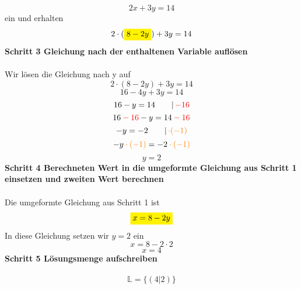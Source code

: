 \documentclass[10pt,landscape]{article}
\begin{document}
\begin{multicols}{3}
    \[2x + 3y = 14\]
    ein und erhalten
    \[2 \cdot ({\colorbox{yellow}{$8 - 2y$}}) + 3y = 14\]
    \textbf{Schritt 3 Gleichung nach der enthaltenen Variable auflösen}\\~\\
    Wir lösen die Gleichung nach y auf
    \[2 \cdot (8 - 2y) + 3y = 14\]
    \[16 - 4y + 3y = 14\]
    \[16 - y = 14 \qquad |\, {\color{red}-16}\]
    \[16 {\color{red}\: - \: 16} - y = 14 {\color{red}\: - \: 16}\]
    \[-y = -2 \qquad |\, {\color{orange}\cdot (-1)}\]
    \[-y {\color{orange}\: \cdot \: (-1)} = -2 {\color{orange} \: \cdot \: (-1)}\]
    \[y = 2\]
    \textbf{Schritt 4 Berechneten Wert in die umgeformte Gleichung aus Schritt 1 einsetzen und zweiten Wert berechnen}\\~\\
    Die umgeformte Gleichung aus Schritt 1 ist
    \[{\colorbox{yellow}{$x = 8 - 2y$}}\]
    In diese Gleichung setzen wir $y = 2$ ein
    \[x = 8 - 2 \cdot 2\]
    \[x = 4\]
    \textbf{Schritt 5 Lösungsmenge aufschreiben}\\~\\
    \[\mathbb{L} = \{(4|2)\}\]

\end{multicols}
\end{document}
